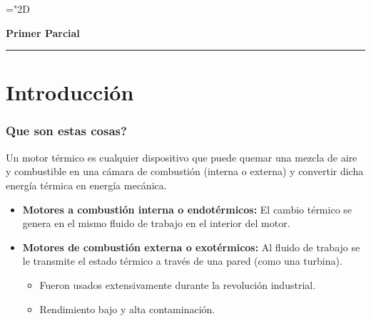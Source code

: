 
\newcommand{\rc}{R_c}
\newcommand{\Calorif}{\mbox{\large$\mathbf{c}$}}
\newcommand{\rp}{R_p}
\newcommand{\grad}{$^\circ$}
\newcommand{\Fp}{F_P}
\newcommand{\Peff}{P}
\newcommand{\ideal}{{ideal}}
\newcommand{\perd}{{perd.}}
\newcommand{\Pideal}{P_\ideal}
\newcommand{\Pperd}{P_\perd}
\newcommand{\Pind}{P_i}
\newcommand{\pmi}{p_{mi}}
\newcommand{\Pot}{{ \mbox{\tiny$P$}}}
\newcommand{\Potmax}{{ \mbox{\tiny$P_\max$}}}
\newcommand{\Torq}{{ \mbox{\tiny$T$}}}
\newcommand{\Torqmax}{{ \mbox{\tiny$T_\max$}}}
\newcommand{\Ce}{C_e}
\newcommand{\pme}{p_{me}}
\newcommand{\etaeff}{\eta_{total}}
\newcommand{\etavol}{\eta_{{\mbox{\tiny$V$}}}}
\newcommand{\util}{\acute{u}til}

\renewcommand{\min}{{m\textrm{í}n}}
\renewcommand{\max}{{m\acute{a}x}}
\newcommand{\ctegas}{k}
\newcommand{\rv}{{R_{\mbox{\tiny $V$}}}}
 \mathchardef\mhyphen="2D
 \newcommand{\hyph}{\,\mhyphen}
 \vspace{.9cm}
{\centering 
{\bf \LARGE Primer Parcial \par}
}
\begin{center}
\vspace{-.2cm}\rule{3cm}{2pt}\par
\vspace{-.2cm}
\end{center}
\part{Introducción}
\section{Que son estas cosas?}

Un motor térmico es cualquier dispositivo que puede quemar una mezcla de aire y combustible en una cámara de combustión (interna o externa) y convertir dicha energía térmica en energía mecánica.

\begin{itemize}
    \item {\bf Motores a combustión interna o endotérmicos:} El cambio térmico se genera en el mismo fluido de trabajo en el interior del motor.
    \item {\bf Motores de combustión externa o exotérmicos:} Al fluido de trabajo se le transmite el estado térmico a través de una pared (como una turbina).
    \begin{itemize}
        \item Fueron usados extensivamente durante la revolución industrial.
        \item Rendimiento bajo y alta contaminación.
    \end{itemize}
\end{itemize}


